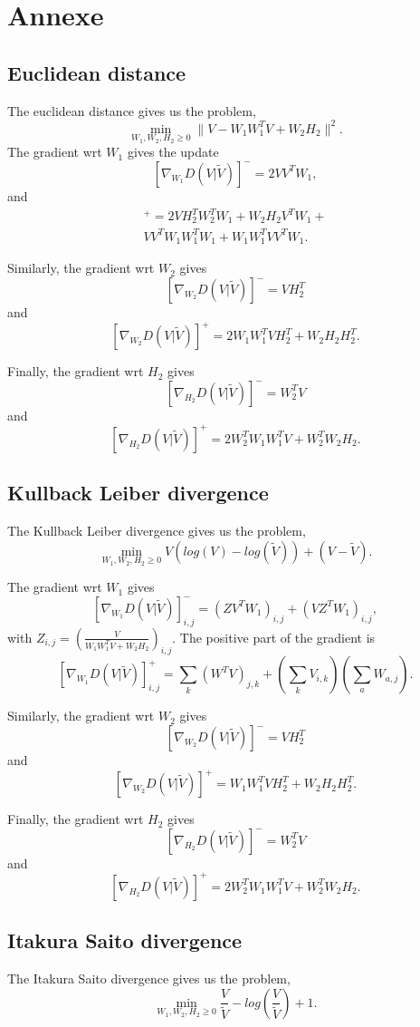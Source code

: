 
\section*{Annexe}

\subsection{Euclidean distance}
\label{euclidisteq}

The euclidean distance gives us the problem,
$$\min_{W_1,W_2,H_2 \geq 0} \|V - W_{1}W_{1}^{T}V + W_{2} H_{2} \|^2.$$
The gradient wrt $W_1$ gives the update
$$[\nabla_{W_1} D(V|\tilde{V})]^{-} = 2 VV^TW_1, $$
and
\begin{align*}
[\nabla_{W_1} D(V|\tilde{V})]^{+} = 2VH_2^TW_2^TW_1 + W_2H_2V^TW_1 + \\ VV^TW_1W_1^TW_1 + W_1W_1^TVV^TW_1.
\end{align*}

Similarly, the gradient wrt $W_2$ gives
$$ [\nabla_{W_2} D(V|\tilde{V})]^{-} = VH_2^T $$
and
$$ [\nabla_{W_2} D(V|\tilde{V})]^{+} = 2W_1W_1^TVH_2^T + W_2H_2H_2^T.$$

Finally, the gradient wrt $H_2$ gives
$$ [\nabla_{H_2} D(V|\tilde{V})]^{-} = W_2^TV  $$
and
$$ [\nabla_{H_2} D(V|\tilde{V})]^{+} = 2W_2^TW_1W_1^TV + W_2^TW_2H_2. $$


\subsection{Kullback Leiber divergence}\label{KLdisteq}
The Kullback Leiber divergence gives us the problem,
$$\min_{W_1,W_2,H_2 \geq 0} V(log(V) - log(\tilde{V})) + (V-\tilde{V}).$$

The gradient wrt $W_1$ gives
$$[\nabla_{W_1} D(V|\tilde{V})]_{i,j}^{-} = (ZV^TW_1)_{i,j} + (VZ^TW_1)_{i,j},$$
with $Z_{i,j} = (\frac{V}{W_1W_1^TV + W_2H_2})_{i,j}$. The positive part of the gradient is
$$[\nabla_{W_1} D(V|\tilde{V})]^{+}_{i,j} = \sum_k(W^TV)_{j,k} + (\sum_{k}V_{i,k})(\sum_a W_{a,j}).$$


Similarly, the gradient wrt $W_2$ gives
$$ [\nabla_{W_2} D(V|\tilde{V})]^{-} = VH_2^T $$
and
$$ [\nabla_{W_2} D(V|\tilde{V})]^{+} = W_1W_1^TVH_2^T + W_2H_2H_2^T.$$

Finally, the gradient wrt $H_2$ gives
$$ [\nabla_{H_2} D(V|\tilde{V})]^{-} = W_2^TV  $$
and
$$ [\nabla_{H_2} D(V|\tilde{V})]^{+} = 2W_2^TW_1W_1^TV + W_2^TW_2H_2. $$

 
\subsection{Itakura Saito divergence}\label{ISdisteq}
The Itakura Saito divergence gives us the problem,
$$\min_{W_1,W_2,H_2 \geq 0} \frac{V}{\tilde{V}} - log(\frac{V}{\tilde{V}}) +1.$$

